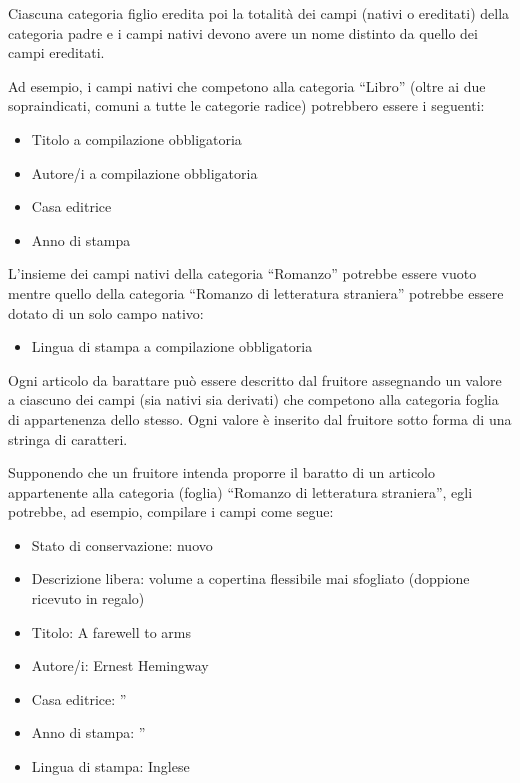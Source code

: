 Ciascuna categoria figlio eredita poi la totalità dei campi (nativi o ereditati) della categoria padre e i campi nativi devono avere un nome distinto da quello dei campi ereditati.\newline

Ad esempio, i campi nativi che competono alla categoria “Libro” (oltre ai due sopraindicati, comuni a tutte le categorie radice) potrebbero essere i seguenti:
\begin{itemize}
    \item Titolo a compilazione obbligatoria
    \item Autore/i a compilazione obbligatoria
    \item Casa editrice
    \item Anno di stampa
\end{itemize}

L’insieme dei campi nativi della categoria “Romanzo” potrebbe essere vuoto mentre quello della categoria “Romanzo di letteratura straniera” potrebbe essere dotato di un solo campo nativo:
\begin{itemize}
    \item Lingua di stampa a compilazione obbligatoria
\end{itemize}

Ogni articolo da barattare può essere descritto dal fruitore assegnando un valore a ciascuno dei campi (sia nativi sia derivati) che competono alla categoria foglia di appartenenza dello stesso.
Ogni valore è inserito dal fruitore sotto forma di una stringa di caratteri.\newline

Supponendo che un fruitore intenda proporre il baratto di un articolo appartenente alla categoria (foglia) “Romanzo di letteratura straniera”, egli potrebbe, ad esempio, compilare i campi come segue:
\begin{itemize}
    \item Stato di conservazione: nuovo
    \item Descrizione libera: volume a copertina flessibile mai sfogliato (doppione ricevuto in regalo)
    \item Titolo: A farewell to arms
    \item Autore/i: Ernest Hemingway
    \item Casa editrice: ''
    \item Anno di stampa: ''
    \item Lingua di stampa: Inglese
\end{itemize}



